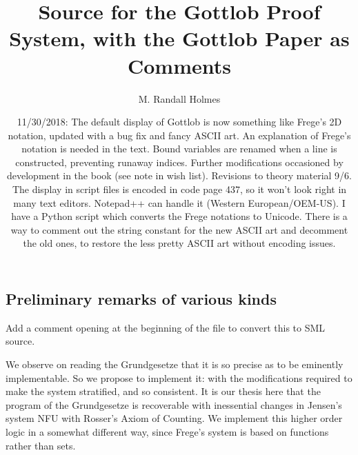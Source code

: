 \documentclass{article}
\title{Source for the Gottlob Proof System,  with the Gottlob Paper as Comments}
\author{M. Randall Holmes}
\date{11/30/2018:  The default display of Gottlob is now something like Frege's 2D notation, updated with a bug fix and fancy ASCII art.  An explanation of Frege's notation is needed in the text.  Bound variables are renamed when a line is constructed, preventing runaway indices.  Further modifications occasioned by development in the book (see note in wish list).  Revisions to theory material 9/6.  The display in script files is encoded in code page 437, so it won't look right in many text editors.  Notepad++ can handle it (Western European/OEM-US).  I have a Python script which converts the Frege notations to Unicode.  There is a way to comment out the string constant for the new ASCII
art and decomment the old ones, to restore the less pretty ASCII art without encoding issues.}
\begin{document}
\maketitle

\subsection{Preliminary remarks of various kinds}

Add a comment opening at the beginning of the file to convert this to SML source.

We observe on reading the Grundgesetze that it is so precise as to be eminently implementable.  So we propose to implement it:  with the modifications required to make the system stratified, and so consistent.  It is our thesis here that the program of the Grundgesetze is recoverable with inessential changes in Jensen's system NFU with Rosser's Axiom of Counting.  We implement this higher order logic in a somewhat different way, since Frege's system is based on functions rather than sets.
\end{document}
